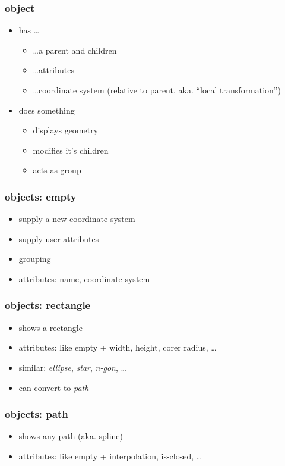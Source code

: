 \documentclass{beamer}
\begin{document}
\begin{frame}[t]\frametitle{object}
\begin{itemize}
  \item has \dots
  \begin{itemize}
    \item \dots a parent and children
    \item \dots attributes
    \item \dots coordinate system (relative to parent, aka. ``local transformation'')
  \end{itemize}
  \item does something
  \begin{itemize}
    \item displays geometry
    \item modifies it's children
    \item acts as group
  \end{itemize}
\end{itemize}
\end{frame}

\begin{frame}[t]\frametitle{objects: empty}
\begin{itemize}
  \item supply a new coordinate system
  \item supply user-attributes
  \item grouping
  \item attributes: name, coordinate system
\end{itemize}
\end{frame}

\begin{frame}[t]\frametitle{objects: rectangle}
\begin{itemize}
  \item shows a rectangle
  \item attributes: like empty + width, height, corer radius, \dots
  \item similar: \emph{ellipse}, \emph{star}, \emph{n-gon}, \dots
  \item can convert to \emph{path}
\end{itemize}
\end{frame}

\begin{frame}[t]\frametitle{objects: path}
\begin{itemize}
  \item shows any path (aka. spline)
  \item attributes: like empty + interpolation, is-closed, \dots
\end{itemize}
\end{frame}
\end{document}
